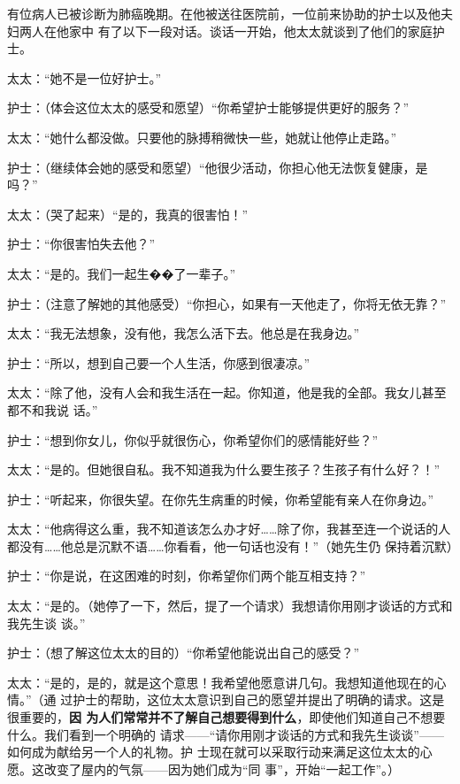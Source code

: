 \documentclass{ctexart}
\renewenvironment{quotation}{\setlength{\parskip}{0.5em}\setstretch{1.5}\kaishu\zihao{-5}\setlength{\parindent}{1em}}{\vspace{1em}}
\begin{document}
有位病人已被诊断为肺癌晚期。在他被送往医院前，一位前来协助的护士以及他夫妇两人在他家中
有了以下一段对话。谈话一开始，他太太就谈到了他们的家庭护士。

\begin{quotation}
	太太：``她不是一位好护士。''

	护士：（体会这位太太的感受和愿望）``你希望护士能够提供更好的服务？''

	太太：``她什么都没做。只要他的脉搏稍微快一些，她就让他停止走路。''

	护士：（继续体会她的感受和愿望）``他很少活动，你担心他无法恢复健康，是吗？''

	太太：（哭了起来）``是的，我真的很害怕！''

	护士：``你很害怕失去他？''

	太太：``是的。我们一起生��了一辈子。''

	护士：（注意了解她的其他感受）``你担心，如果有一天他走了，你将无依无靠？''

	太太：``我无法想象，没有他，我怎么活下去。他总是在我身边。''

	护士：``所以，想到自己要一个人生活，你感到很凄凉。''

	太太：``除了他，没有人会和我生活在一起。你知道，他是我的全部。我女儿甚至都不和我说
	话。''

	护士：``想到你女儿，你似乎就很伤心，你希望你们的感情能好些？''

	太太：``是的。但她很自私。我不知道我为什么要生孩子？生孩子有什么好？！''

	护士：``听起来，你很失望。在你先生病重的时候，你希望能有亲人在你身边。''

	太太：``他病得这么重，我不知道该怎么办才好\ldots\ldots 除了你，我甚至连一个说话的人
	都没有\ldots\ldots 他总是沉默不语\ldots\ldots 你看看，他一句话也没有！''（她先生仍
	保持着沉默）

	护士：``你是说，在这困难的时刻，你希望你们两个能互相支持？''

	太太：``是的。（她停了一下，然后，提了一个请求）我想请你用刚才谈话的方式和我先生谈
	谈。''

	护士：（想了解这位太太的目的）``你希望他能说出自己的感受？''

	太太：``是的，是的，就是这个意思！我希望他愿意讲几句。我想知道他现在的心情。''（通
	过护士的帮助，这位太太意识到自己的愿望并提出了明确的请求。这是很重要的，\textbf{因
		为人们常常并不了解自己想要得到什么}，即使他们知道自己不想要什么。我们看到一个明确的
	请求------``请你用刚才谈话的方式和我先生谈谈''------如何成为献给另一个人的礼物。护
	士现在就可以采取行动来满足这位太太的心愿。这改变了屋内的气氛------因为她们成为``同
	事''，开始``一起工作''。）


\end{quotation}
\end{document}
